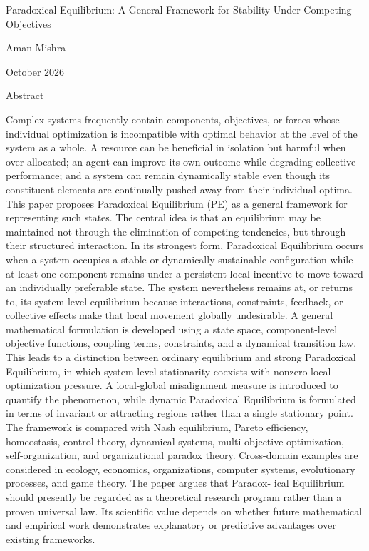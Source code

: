 \documentclass[10pt,a4paper]{article}
\begin{document}
\begin{ManuscriptText}
Paradoxical Equilibrium: A General Framework for
            Stability Under Competing Objectives

                                           Aman Mishra

                                            October 2026


                                               Abstract

         Complex systems frequently contain components, objectives, or forces whose individual
     optimization is incompatible with optimal behavior at the level of the system as a whole.
     A resource can be beneficial in isolation but harmful when over-allocated; an agent can
     improve its own outcome while degrading collective performance; and a system can remain
     dynamically stable even though its constituent elements are continually pushed away from
     their individual optima. This paper proposes Paradoxical Equilibrium (PE) as a general
     framework for representing such states.
         The central idea is that an equilibrium may be maintained not through the elimination
     of competing tendencies, but through their structured interaction. In its strongest form,
     Paradoxical Equilibrium occurs when a system occupies a stable or dynamically sustainable
     configuration while at least one component remains under a persistent local incentive to move
     toward an individually preferable state. The system nevertheless remains at, or returns to,
     its system-level equilibrium because interactions, constraints, feedback, or collective effects
     make that local movement globally undesirable.
         A general mathematical formulation is developed using a state space, component-level
     objective functions, coupling terms, constraints, and a dynamical transition law. This leads
     to a distinction between ordinary equilibrium and strong Paradoxical Equilibrium, in which
     system-level stationarity coexists with nonzero local optimization pressure. A local-global
     misalignment measure is introduced to quantify the phenomenon, while dynamic Paradoxical
     Equilibrium is formulated in terms of invariant or attracting regions rather than a single
     stationary point.
         The framework is compared with Nash equilibrium, Pareto efficiency, homeostasis, control
     theory, dynamical systems, multi-objective optimization, self-organization, and organizational
     paradox theory. Cross-domain examples are considered in ecology, economics, organizations,
     computer systems, evolutionary processes, and game theory. The paper argues that Paradox-
     ical Equilibrium should presently be regarded as a theoretical research program rather than
     a proven universal law. Its scientific value depends on whether future mathematical and
     empirical work demonstrates explanatory or predictive advantages over existing frameworks.



\end{ManuscriptText}
\end{document}
